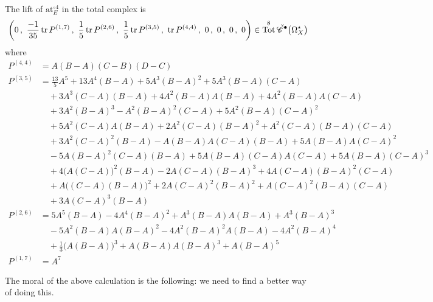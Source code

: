 \documentclass[11pt,fleqn]{article}
\theoremstyle{plain}
\theoremstyle{definition}
\theoremstyle{remark}
\numberwithin{equation}{theorem}
\newcommand{\anotherbullet}{\star}
\newcommand{\cech}{\check{\mathscr{C}}}
\newcommand{\at}{\mathrm{at}}
\newcommand{\expat}[1]{\at^{\circ#1}}
\DeclareMathOperator{\Tot}{Tot}
\begin{document}
        The lift of $\expat{4}_E$ in the total complex is
        \begin{equation*}
            \left(
                0\,,\,\,
                \frac{-1}{35}\tr P^{(1,7)}\,,\,\,
                \frac15\tr P^{(2,6)}\,,\,\,
                \frac15\tr P^{(3,5)}\,,\,\,
                \tr P^{(4,4)}\,,\,\,
                0\,,\,\,
                0\,,\,\,
                0\,,\,\,
                0
            \right) \in \Tot^8\cech^\bullet\big(\Omega^\anotherbullet_X\big)
        \end{equation*}
        where
        \begin{align*}
            P^{(4,4)}
            &= A(B-A)(C-B)(D-C)
        \\  P^{(3,5)}
            &=
            \frac{13}{5} A^5
            +13 A^4(B-A)
            +5 A^3(B-A)^2
            +5 A^3(B-A)(C-A)
        \\  &\quad+3 A^3(C-A)(B-A)
            +4 A^2(B-A)A(B-A)
            +4 A^2(B-A)A(C-A)
        \\  &\quad+3 A^2(B-A)^3
            - A^2(B-A)^2(C-A)
            +5A^2(B-A)(C-A)^2
        \\  &\quad+5A^2(C-A)A(B-A)
            +2 A^2(C-A)(B-A)^2
            + A^2(C-A)(B-A)(C-A)
        \\  &\quad+3 A^2(C-A)^2(B-A)
            - A(B-A)A(C-A)(B-A)
            +5 A(B-A)A(C-A)^2
        \\  &\quad-5 A(B-A)^2(C-A)(B-A)
            +5 A(B-A)(C-A)A(C-A)
            +5 A(B-A)(C-A)^3
        \\  &\quad+4 \big(A(C-A)\big)^2(B-A)
            -2 A(C-A)(B-A)^3
            +4 A(C-A)(B-A)^2(C-A)
        \\  &\quad+ A\big((C-A)(B-A)\big)^2
            +2 A(C-A)^2(B-A)^2
            + A(C-A)^2(B-A)(C-A)
        \\  &\quad+3 A(C-A)^3(B-A)
        \\  P^{(2,6)}
            &=
            5 A^5(B-A)
            -4 A^4(B-A)^2
            + A^3(B-A)A(B-A)
            + A^3(B-A)^3
        \\  &\quad-5 A^2(B-A)A(B-A)^2
            -4 A^2(B-A)^2A(B-A)
            -4 A^2(B-A)^4
        \\  &\quad+\frac{1}{3} \big(A(B-A)\big)^3
            + A(B-A)A(B-A)^3
            + A(B-A)^5
        \\  P^{(1,7)}
            &= A^7
        \end{align*}

        The moral of the above calculation is the following: we need to find a better way of doing this.
\end{document}
